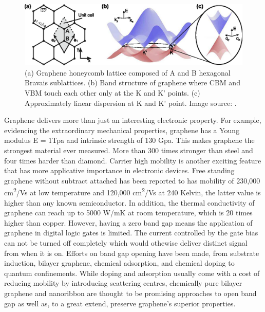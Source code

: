 \begin{figure}[htbp!] 
\centering  
\includegraphics[width=\textwidth]{gra_lat_band.eps}
\caption[Graphene lattice and band structure.]{(a) Graphene honeycomb lattice composed of A and B hexagonal Bravais sublattices. (b) Band structure of graphene where CBM and VBM touch each other only at the K and K' points. (c) Approximately linear dispersion at K and K' point. Image source: \cite{Guttinger2012}. }  
\label{fig:gra_band}
\end{figure} 

Graphene delivers more than just an interesting electronic property. For example, evidencing the extraordinary mechanical properties, graphene has a Young modulus E = 1Tpa and intrinsic strength of 130 Gpa\cite{Lee385}. This makes graphene the strongest material ever measured. More than 300 times stronger than steel and four times harder than diamond. Carrier high mobility is another exciting feature that has more applicative importance in electronic devices. Free standing graphene without subtract attached has been reported to has mobility of 230,000 \si{cm^2/Vs} at low temperature\cite{Bolotin2008a} and 120,000 \si{cm^2/Vs} at 240 Kelvin, the latter value is higher than any known semiconductor\cite{Bolotin2008b}. In addition, the thermal conductivity of graphene can reach up to 5000 \si{W/mK} at room temperature, which is 20 times higher than copper\cite{balandin2008}. However, having a zero band gap means the application of graphene in digital logic gates is limited. The current controlled by the gate bias can not be turned off completely which would othewise deliver distinct signal from when it is on. Efforts on band gap opening have been made, from substrate induction\cite{Ci2010,zhou2007}, bilayer graphene\cite{mccann2006,castro2007}, chemical adsorption\cite{Elias2009,Jeon2011}, and chemical doping\cite{zhou2008} to quantum confinements\cite{Nakada1996,Barone2006}.  While doping and adsorption usually come with a cost of reducing mobility by introducing scattering centres, chemically pure bilayer graphene and nanoribbon are thought to be promising approaches to open band gap as well as, to a great extend, preserve graphene's superior properties.

